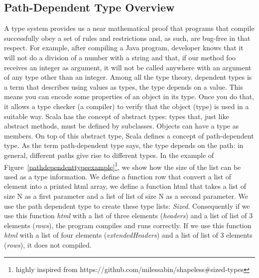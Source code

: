 \documentclass[runningheads,a4paper]{llncs}
\begin{document}
\subsection{Path-Dependent Type Overview}

A type system provides us a near mathematical proof that programs that compile successfully obey a
set of rules and restrictions and, as such, are bug-free in that respect. For example, after
compiling a Java program, developer knows that it will not do a division of a number with a
string and that, if our method foo receives an integer as argument, it will not be called anywhere
with an argument of any type other than an integer. Among all the type theory,  dependent types is a term that describes using values as types, the type depends on a value. This means you can encode some properties of an object in its type. Once you do
that, it allows a type checker (a compiler) to verify that the object (type) is used in a suitable
way. Scala has the concept of abstract types: types
that, just like abstract methods, must be defined by subclasses. Objects can have a type as members. On top of this abstract type, Scala defines a concept of path-dependent type.  As the term path-dependent type says, the type depends on the path: in general, different paths give
rise to different types. In the example of Figure~\ref{pathdependenttypeexample}\footnote{highly inspired from https://github.com/milessabin/shapeless\#sized-types}, we show how the size of the list can be used as a type information. We define a function row that convert a list of element into a printed html array, we define a function html that takes a list of size N as a first parameter and a list of list of size N as a second parameter. We use the path dependent type to create these type lists: \emph{Sized}. Consequently if we use this function \emph{html} with a list of three elements (\textit{headers}) and a list of list of 3 elements (\textit{rows}), the program compiles and runs correctly. If we use  this function \emph{html} with a list of four elements (\textit{extendedHeaders}) and a list of list of 3 elements (\textit{rows}), it does not compiled. 
\end{document}
